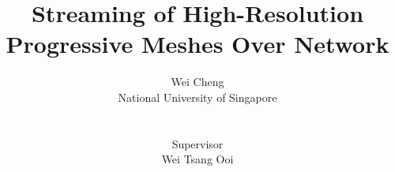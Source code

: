 \documentclass[11pt, a4paper]{report}
\title{Streaming of High-Resolution Progressive Meshes Over Network}
\author{Wei Cheng\\
National University of Singapore\\
\\
\\
Supervisor\\
Wei Tsang Ooi}
\begin{document}
\doublespacing
    \begin{comment}
    High-resolution 3D meshes are increasingly available in networked
    applications, such as digital museum, online game, and virtual reality.
    The amount of data constituting a high-resolution 3D mesh can be
    huge, leading to a long downloading time. 
    To reduce the waiting time of users, 
    a common technique for remote viewing is progressive streaming,
    which allows a low-resolution version of the mesh to be transmitted
    and rendered with low latency. Then the quality of the transmitted 
    mesh can be incrementally improved when the refinement information
    is continuously being transmitted.

    Progressive mesh is commonly used to support progressive
    streaming. A progressive mesh comprises a \emph{base mesh} and a series
    of refinements. The base mesh is obtained by simplifying the original mesh
    with a series of \emph{edge collapses}.
    With the \emph{vertex splits}, the inverses of these edge
    collapses, the original mesh can be reconstructed from the base mesh.
    Therefore, progressive streaming can be implemented by sending the vertex
    splits as refinements after sending the base mesh.

    Although streaming of videos is extensively studied, 
    streaming of high-resolution progressive meshes is considerably different.
    Frames of a video are usually sent following the time order,
    vertex splits of a progressive mesh, however, can be sent in various of orders.
    Some new research problems arise due to the flexibility in sending order of 
    vertex splits. In this thesis, four related topics are discussed. 
       

\end{comment}
\end{document}
